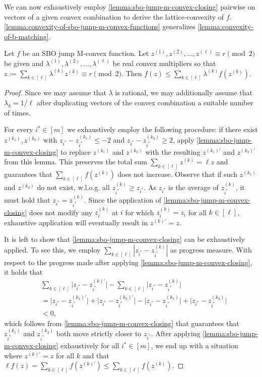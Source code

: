 \documentclass[a4paper,UKenglish,cleveref,thm-restate]{lipics-v2021}
\begin{document}
{We can now exhaustively employ \cref{lemma:sbo-jump-m-convex-closing} pairwise on vectors of a given convex combination to derive the lattice-convexity of $f$. \cref{lemma:convexity-of-sbo-jump-m-convex-functions} generalizes \cref{lemma:convexity-of-b-matching}.

\begin{lemma}
    Let $f$ be an SBO jump M-convex function. Let $z^{(1)},z^{(2)},\dots,z^{(\ell)}\equiv r\pmod2$ be given and $\lambda^{(1)},\lambda^{(2)},\dots,\lambda^{(\ell)}$ be real convex multipliers so that $z:=\sum_{k\in[\ell]}\lambda^{(k)}z^{(k)}\equiv r\pmod2$. Then $f(z)\le\sum_{k\in[\ell]}\lambda^{(k)}f(z^{(k)})$.
    \label{lemma:convexity-of-sbo-jump-m-convex-functions}
\end{lemma}

\begin{proof}
    Since we may assume that $\lambda$ is rational, we may additionally assume that $\lambda_k=1/\ell$ after duplicating vectors of the convex combination a suitable number of times.

    For every $i^*\in[m]$ we exhaustively employ the following procedure: if there exist $z^{(k_1)},z^{(k_2)}$ with $z_{i^*}-z_{i^*}^{(k_1)}\le-2$ and $z_{i^*}-z_{i^*}^{(k_2)}\ge2$, apply \cref{lemma:sbo-jump-m-convex-closing} to replace $z^{(k_1)}$ and $z^{(k_2)}$ with the resulting $z^{(k_1)\prime}$ and $z^{(k_2)\prime}$ from this lemma. This preserves the total sum $\sum_{k\in[\ell]}z^{(k)}=\ell z$ and guarantees that $\sum_{k\in[\ell]}f(z^{(k)})$ does not increase. Observe that if such $z^{(k_1)}$ and $z^{(k_2)}$ do not exist, w.l.o.g. all $z_{i^*}^{(k)}\ge z_{i^*}$. As $z_{i^*}$ is the average of $z_{i^*}^{(k)}$, it must hold that $z_{i^*}=z_{i^*}^{(k)}$. Since the application of \cref{lemma:sbo-jump-m-convex-closing} does not modify any $z_i^{(k)}$ at $i$ for which $z_i^{(k)}=z_i$ for all $k\in[\ell]$, exhaustive application will eventually result in $z^{(k)\prime}=z$.
    
    It is left to show that \cref{lemma:sbo-jump-m-convex-closing} can be exhaustively applied. To see this, we employ $\sum_{k\in[\ell]}|z_{i^*}-z_{i^*}^{(k)}|$ as progress measure. With respect to the progress made after applying \cref{lemma:sbo-jump-m-convex-closing}, it holds that
    \begin{align*}
        &\sum_{k\in[\ell]}\bigl|z_{i^*}-z_{i^*}^{(k)\prime}\bigr|-\sum_{k\in[\ell]}\bigl|z_{i^*}-z_{i^*}^{(k)}\bigr|\\
        &=
        \bigl|z_{i^*}-z_{i^*}^{(k_1)\prime}\bigr|+\bigl|z_{i^*}-z_{i^*}^{(k_2)\prime}\bigr|-\bigl|z_{i^*}-z_{i^*}^{(k_1)}\bigr|+\bigl|z_{i^*}-z_{i^*}^{(k_2)}\bigr|\\
        &<0,
    \end{align*}
    which follows from \cref{lemma:sbo-jump-m-convex-closing}  that guarantees that $z_{i^*}^{(k_1)}$ and $z_{i^*}^{(k_2)}$ both move strictly closer to $z_{i^*}$. After applying \cref{lemma:sbo-jump-m-convex-closing} exhaustively for all $i^*\in[m]$, we end up with a situation where $z^{(k)\prime}=z$ for all $k$ and that $\ell f(z)=\sum_{k\in[\ell]}f(z^{(k)\prime})\le\sum_{k\in[\ell]}f(z^{(k)})$.
\end{proof}

}
\end{document}
